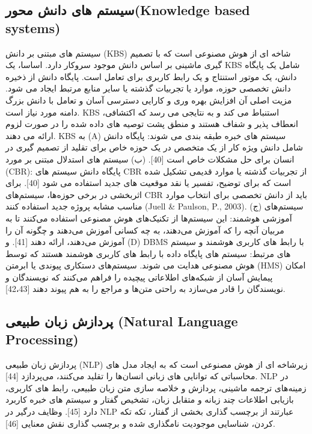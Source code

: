 \documentclass[towcolumn, 11pt]{Article}
\begin{document}
\begin{چکیده}
\subsection{سیستم های دانش محور(Knowledge based systems)}
سیستم های مبتنی بر دانش (KBS) شاخه ای از هوش مصنوعی است که با تصمیم گیری ماشینی بر اساس دانش موجود سروکار دارد. اساسا، یک KBS شامل یک پایگاه دانش، یک موتور استنتاج و یک رابط کاربری برای تعامل است. پایگاه دانش از ذخیره دانش تخصصی حوزه، موارد یا تجربیات گذشته یا سایر منابع مرتبط ایجاد می شود. مزیت اصلی آن افزایش بهره وری و کارایی دسترسی آسان و تعامل با دانش بزرگ دامنه مورد نیاز است. KBS استنباط می کند و به نتایجی می رسد که اکتشافی، انعطاف پذیر و شفاف هستند و منطق پشت توصیه های داده شده را در صورت لزوم ارائه می دهند. KBS به (A) سیستم های خبره طبقه بندی می شوند: پایگاه دانش شامل دانش ویژه کار از یک متخصص در یک حوزه خاص برای تقلید از تصمیم گیری در انسان برای حل مشکلات خاص است [40]. (ب) سیستم های استدلال مبتنی بر مورد (CBR): پایگاه دانش سیستم های CBR از تجربیات گذشته یا موارد قدیمی تشکیل شده است که برای توضیح، تفسیر یا نقد موقعیت های جدید استفاده می شود [40]. برای اثربخشی در برخی حوزه‌ها، سیستم‌های CBR باید از دانش تخصصی برای انتخاب موارد مناسب مشابه پروژه جدید استفاده کنند (Juell & Paulson, P., 2003). (ج) سیستم‌های آموزشی هوشمند: این سیستم‌ها از تکنیک‌های هوش مصنوعی استفاده می‌کنند تا به مربیان آنچه را که آموزش می‌دهند، به چه کسانی آموزش می‌دهند و چگونه آن را آموزش می‌دهند، ارائه دهند [41]. و (D) DBMS با رابط های کاربری هوشمند و سیستم های مرتبط: سیستم های پایگاه داده با رابط های کاربری هوشمند هستند که توسط هوش مصنوعی هدایت می شوند. سیستم‌های دستکاری پیوندی یا ابرمتن (HMS) امکان پیمایش آسان از شبکه‌های اطلاعاتی پیچیده را فراهم می‌کنند که نویسندگان و نویسندگان را قادر می‌سازد به راحتی متن‌ها و مراجع را به هم پیوند دهند [42،43].

\subsection{پردازش زبان طبیعی
(Natural Language Processing)}
پردازش زبان طبیعی (NLP) زیرشاخه‌ ای از هوش مصنوعی است که به ایجاد مدل‌ های محاسباتی که توانایی‌ های زبانی انسان‌ها را تقلید می‌کنند، می‌پردازد [44]. NLP در زمینه‌های ترجمه ماشینی، پردازش و خلاصه‌ سازی متن زبان طبیعی، رابط‌ های کاربری، بازیابی اطلاعات چند زبانه و متقابل زبان، تشخیص گفتار و سیستم‌ های خبره کاربرد دارد [45]. وظایف درگیر در NLP عبارتند از برچسب گذاری بخشی از گفتار، تکه تکه کردن، شناسایی موجودیت نامگذاری شده و برچسب گذاری نقش معنایی [46].


\end{چکیده}
\end{document}
